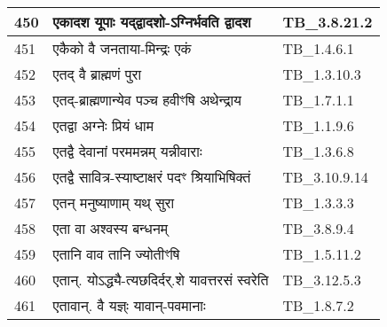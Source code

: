 \documentclass[17pt]{extarticle}
\begin{document}
\begin{longtable}{||p{0.4in}||p{4.9in}||p{0.9in}||}
    \hline
        
    450 & एकादश यूपाः यद्द्वादशो{-}ऽग्निर्भवति द्वादश & TB\_3.8.21.2       \\
    
    \hline
        
    451 & एकैको वै जनताया{-}मिन्द्रः एकं & TB\_1.4.6.1       \\
    
    \hline
        
    452 & एतद् वै ब्राह्मणं पुरा & TB\_1.3.10.3       \\
    
    \hline
        
    453 & एतद्{-}ब्राह्मणान्येव पञ्च हवीꣳषि अथेन्द्राय & TB\_1.7.1.1       \\
    
    \hline
        
    454 & एतद्वा अग्नेः प्रियं धाम & TB\_1.1.9.6       \\
    
    \hline
        
    455 & एतद्वै देवानां परममन्नम् यन्नीवाराः & TB\_1.3.6.8       \\
    
    \hline
        
    456 & एतद्वै सावित्र{-}स्याष्टाक्षरं पदꣳ श्रियाभिषिक्तं & TB\_3.10.9.14       \\
    
    \hline
        
    457 & एतन् मनुष्याणाम् यथ् सुरा & TB\_1.3.3.3       \\
    
    \hline
        
    458 & एता वा अश्वस्य बन्धनम् & TB\_3.8.9.4       \\
    
    \hline
        
    459 & एतानि वाव तानि ज्योतीꣳषि & TB\_1.5.11.2       \\
    
    \hline
        
    460 & एतान्. योऽद्ध्यै{-}त्यछदिर्दर्.शे यावत्तरसं स्वरेति & TB\_3.12.5.3       \\
    
    \hline
        
    461 & एतावान्. वै यज्ञ्ः यावान्{-}पवमानाः & TB\_1.8.7.2       \\
    
    \hline
        

\end{longtable}
\end{document}
